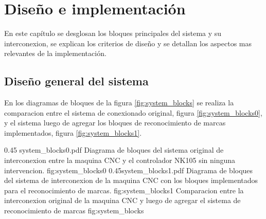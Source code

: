 \chapter{Diseño e implementación} %

\label{Chapter3}

En este capítulo se desglosan los bloques principales del sistema y su interconexion, se explican los criterios de diseño y se detallan los aspectos mas relevantes de la implementación.

\section{Diseño general del sistema}

En los diagramas de bloques de la figura \ref{fig:system_blocks} se realiza la comparacion entre el sistema de conexionado original, figura \ref{fig:system_blocks0}, y el sistema luego de agregar los bloques de reconocimiento de marcas implementados, figura \ref{fig:system_blocks1}.

\subfigab 
         {0.45} {system_blocks0.pdf} {Diagrama de bloques del sistema original de interconexion entre la maquina CNC y el controlador NK105 sin ninguna intervencion.} {fig:system_blocks0}
         {0.45}{system_blocks1.pdf} {Diagrama de bloques del sistema de interconexion de la maquina CNC con los bloques implementados para el reconocimiento de marcas.} {fig:system_blocks1}
         {Comparacion entre la interconexion original de la maquina CNC y luego de agregar el sistema de reconocimiento de marcas}
         {fig:system_blocks}

